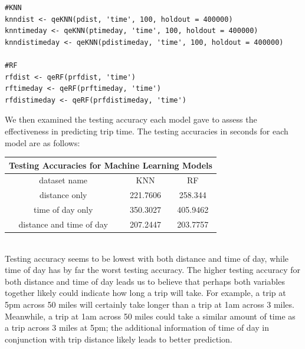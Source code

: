 \documentclass[letterpaper, 12 pt, conference]{article}
\begin{document}
\begin{lstlisting}
#KNN 
knndist <- qeKNN(pdist, 'time', 100, holdout = 400000)
knntimeday <- qeKNN(ptimeday, 'time', 100, holdout = 400000)
knndistimeday <- qeKNN(pdistimeday, 'time', 100, holdout = 400000)

#RF 
rfdist <- qeRF(prfdist, 'time')
rftimeday <- qeRF(prftimeday, 'time')
rfdistimeday <- qeRF(prfdistimeday, 'time')
\end{lstlisting}
We then examined the testing accuracy each model gave to assess the effectiveness in predicting trip time. The testing accuracies in seconds for each model are as follows: 
\begin{center}
 \begin{tabular}{||c || c c ||} 
 \hline
 \multicolumn{3}{|c|}{Testing Accuracies for Machine Learning Models} \\
  \hline
dataset name & KNN & RF\\ [0.5ex] 
 \hline\hline
 distance only & 221.7606 & 258.344\\ 
 \hline
 time of day only & 350.3027 & 405.9462\\
 \hline
 distance and time of day & 207.2447 & 203.7757\\ [1ex] 
 \hline
\end{tabular}
\end{center}

\\Testing accuracy seems to be lowest with both distance and time of day, while time of day has by far the worst testing accuracy. The higher testing accuracy for both distance and time of day leads us to believe that perhaps both variables together likely could indicate how long a trip will take. For example, a trip at 5pm across 50 miles will certainly take longer than a trip at 1am across 3 miles. Meanwhile, a trip at 1am across 50 miles could take a similar amount of time as a trip across 3 miles at 5pm; the additional information of time of day in conjunction with trip distance likely leads to better prediction. 
\end{document}
